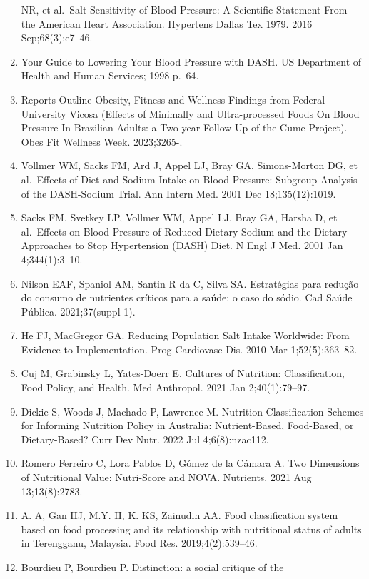 \documentclass[
]{article}
\begin{document}
\begin{enumerate}
  NR, et al.~Salt Sensitivity of Blood Pressure: A Scientific Statement
  From the American Heart Association. Hypertens Dallas Tex 1979. 2016
  Sep;68(3):e7--46.
\item
  Your Guide to Lowering Your Blood Pressure with DASH. US Department of
  Health and Human Services; 1998 p.~64.
\item
  Reports Outline Obesity, Fitness and Wellness Findings from Federal
  University Vicosa (Effects of Minimally and Ultra-processed Foods On
  Blood Pressure In Brazilian Adults: a Two-year Follow Up of the Cume
  Project). Obes Fit Wellness Week. 2023;3265-.
\item
  Vollmer WM, Sacks FM, Ard J, Appel LJ, Bray GA, Simons-Morton DG, et
  al.~Effects of Diet and Sodium Intake on Blood Pressure: Subgroup
  Analysis of the DASH-Sodium Trial. Ann Intern Med. 2001 Dec
  18;135(12):1019.
\item
  Sacks FM, Svetkey LP, Vollmer WM, Appel LJ, Bray GA, Harsha D, et
  al.~Effects on Blood Pressure of Reduced Dietary Sodium and the
  Dietary Approaches to Stop Hypertension (DASH) Diet. N Engl J Med.
  2001 Jan 4;344(1):3--10.
\item
  Nilson EAF, Spaniol AM, Santin R da C, Silva SA. Estratégias para
  redução do consumo de nutrientes críticos para a saúde: o caso do
  sódio. Cad Saúde Pública. 2021;37(suppl 1).
\item
  He FJ, MacGregor GA. Reducing Population Salt Intake Worldwide: From
  Evidence to Implementation. Prog Cardiovasc Dis. 2010 Mar
  1;52(5):363--82.
\item
  Cuj M, Grabinsky L, Yates-Doerr E. Cultures of Nutrition:
  Classification, Food Policy, and Health. Med Anthropol. 2021 Jan
  2;40(1):79--97.
\item
  Dickie S, Woods J, Machado P, Lawrence M. Nutrition Classification
  Schemes for Informing Nutrition Policy in Australia: Nutrient-Based,
  Food-Based, or Dietary-Based? Curr Dev Nutr. 2022 Jul 4;6(8):nzac112.
\item
  Romero Ferreiro C, Lora Pablos D, Gómez de la Cámara A. Two Dimensions
  of Nutritional Value: Nutri-Score and NOVA. Nutrients. 2021 Aug
  13;13(8):2783.
\item
  A. A, Gan HJ, M.Y. H, K. KS, Zainudin AA. Food classification system
  based on food processing and its relationship with nutritional status
  of adults in Terengganu, Malaysia. Food Res. 2019;4(2):539--46.
\item
  Bourdieu P, Bourdieu P. Distinction: a social critique of the

\end{enumerate}
\end{document}

